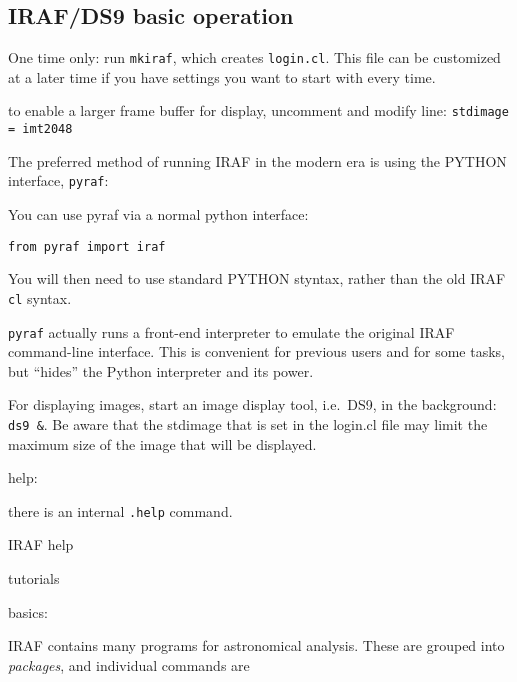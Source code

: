 \documentclass[12pt]{article}
\begin{document}
\subsection*{IRAF/DS9 basic operation}
\begin{itemize*}
    \item One time only: run \texttt{mkiraf}, which creates \texttt{login.cl}.
        This file can be customized at a later time if you have settings you want
        to start with every time.
        \begin{itemize*}
            \item to enable a larger frame buffer for display, uncomment and
                modify line: \texttt{stdimage = imt2048}
        \end{itemize*}
    \item The preferred method of running IRAF in the modern era is using the
        PYTHON interface, \texttt{pyraf}:
        \begin{itemize*}
            \item You can use pyraf via a normal python interface:

                \texttt{from pyraf import iraf}

                You will then need to use standard PYTHON styntax, rather
                than the old IRAF \texttt{cl} syntax.
            \item \texttt{pyraf} actually runs a front-end interpreter to
                emulate the original IRAF command-line interface. This is
                convenient for previous users and for some tasks, but
                ``hides'' the Python interpreter and its power.
        \end{itemize*}
    \item For displaying images, start an image display tool, i.e.\ DS9,
        in the background: \texttt{ds9 \&}. Be aware that the stdimage that is set
        in the login.cl file may limit the maximum size of the image that will
        be displayed.
    \item help:
        \begin{itemize*}
            \item there is an internal \texttt{.help} command.
            \item IRAF help
            \item tutorials
        \end{itemize*}
    \item basics:
        \begin{itemize*}
            \item IRAF contains many programs for astronomical analysis. These
                are grouped into \emph{packages}, and individual commands are
        \end{itemize*}
\end{itemize*}
\end{document}
